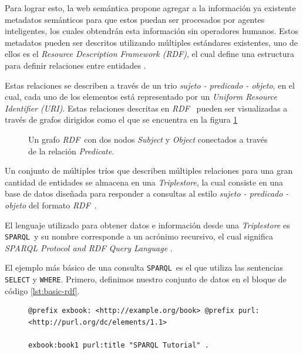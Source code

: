 \documentclass[conference,compsoc]{IEEEtran}
\newcommand{\rdf}{\textit{RDF}\ } \newcommand{\spql}{\texttt{SPARQL}\ }
\begin{document}
Para lograr esto, la web semántica propone agregar a la información ya existente
metadatos semánticos para que estos puedan ser procesados por agentes
inteligentes, los cuales obtendrán esta información sin operadores humanos.
Estos metadatos pueden ser descritos utilizando múltiples estándares existentes,
uno de ellos es el \textit{Resource Description Framework (RDF)}, el cual define
una estructura para definir relaciones entre entidades \cite{world2014rdf}.

Estas relaciones se describen a través de un trio \textit{sujeto - predicado -
objeto}, en el cual, cada uno de los elementos está representado por un
\textit{Uniform Resource Identifier (URI)}. Estas relaciones descritas en \rdf
pueden ser visualizadas a través de grafos dirigidos como el que se encuentra en
la figura \ref{fig:rdf-graph1}

\begin{figure}%
    \label{fig:rdf-graph1}
    \centering
    
    \caption{Un grafo \rdf con dos nodos \textit{Subject} y \textit{Object}
    conectados a través de la relación \textit{Predicate}.}
\end{figure}

Un conjunto de múltiples tríos que describen múltiples relaciones para una gran
cantidad de entidades se almacena en una \textit{Triplestore}, la cual consiste
en una base de datos diseñada para responder a consultas al estilo
\textit{sujeto - predicado - objeto} del formato \rdf \cite{rusher2001triple}.

El lenguaje utilizado para obtener datos e información desde una
\textit{Triplestore} es \spql y su nombre corresponde a un acrónimo recursivo,
el cual significa \textit{SPARQL Protocol and RDF Query Language}
\cite{world2013sparql}.

El ejemplo más básico de una consulta \spql es el que utiliza las sentencias
\texttt{SELECT} y \texttt{WHERE}. Primero, definimos nuestro conjunto de datos
en el bloque de código \ref{lst:basic-rdf}.

\begin{figure}
    \begin{lstlisting}[captionpos=b, caption=Datos en formato \rdf., label=lst:basic-rdf, basicstyle=\ttfamily, frame=single]
@prefix exbook: <http://example.org/book> @prefix purl:
<http://purl.org/dc/elements/1.1>

exbook:book1 purl:title "SPARQL Tutorial" .
     \end{lstlisting}
\end{figure}
\end{document}
